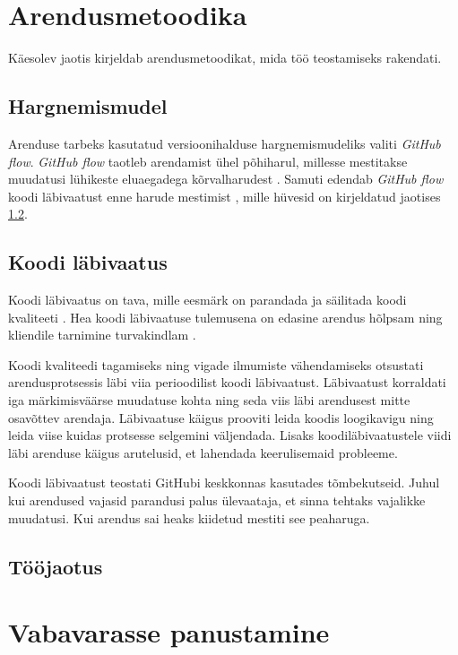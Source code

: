 \section{Arendusmetoodika}

Käesolev jaotis kirjeldab arendusmetoodikat, mida töö teostamiseks rakendati.

\subsection{Hargnemismudel}

Arenduse tarbeks kasutatud versioonihalduse hargnemismudeliks valiti \textit{GitHub flow}. \textit{GitHub flow} taotleb arendamist ühel põhiharul, millesse mestitakse muudatusi lühikeste eluaegadega kõrvalharudest \cite{github-flow}. Samuti edendab \textit{GitHub flow} koodi läbivaatust enne harude mestimist \cite{github-flow}, mille hüvesid on kirjeldatud jaotises \ref{subsec:code-review}.

\subsection{Koodi läbivaatus}\label{subsec:code-review}

Koodi läbivaatus on tava, mille eesmärk on parandada ja säilitada koodi kvaliteeti \cite{gitlab-code-review}. Hea koodi läbivaatuse tulemusena on edasine arendus hõlpsam ning kliendile tarnimine turvakindlam \cite{gitlab-code-review}.

Koodi kvaliteedi tagamiseks ning vigade ilmumiste vähendamiseks otsustati arendusprotsessis läbi viia perioodilist koodi läbivaatust. Läbivaatust korraldati iga märkimisväärse muudatuse kohta ning seda viis läbi arendusest mitte osavõttev arendaja. Läbivaatuse käigus prooviti leida koodis loogikavigu ning leida viise kuidas protsesse selgemini väljendada. Lisaks koodiläbivaatustele viidi läbi arenduse käigus arutelusid, et lahendada keerulisemaid probleeme.

Koodi läbivaatust teostati GitHubi keskkonnas kasutades tõmbekutseid. Juhul kui arendused vajasid parandusi palus ülevaataja, et sinna tehtaks vajalikke muudatusi. Kui arendus sai heaks kiidetud mestiti see peaharuga.

\subsection{Tööjaotus}


\section{Vabavarasse panustamine}

